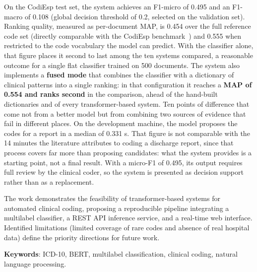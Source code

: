 On the CodiEsp test set, the system achieves an F1-micro of 0.495 and an F1-macro of 0.108 (global decision threshold of 0.2, selected on the validation set). Ranking quality, measured as per-document MAP, is 0.454 over the full reference code set (directly comparable with the CodiEsp benchmark~\cite{miranda2020}) and 0.555 when restricted to the code vocabulary the model can predict. With the classifier alone, that figure places it second to last among the ten systems compared, a reasonable outcome for a single flat classifier trained on 500 documents. The system also implements a \textbf{fused mode} that combines the classifier with a dictionary of clinical patterns into a single ranking: in that configuration it reaches a \textbf{MAP of 0.554 and ranks second} in the comparison, ahead of the hand-built dictionaries and of every transformer-based system. Ten points of difference that come not from a better model but from combining two sources of evidence that fail in different places. On the development machine, the model proposes the codes for a report in a median of 0.331 s. That figure is not comparable with the 14 minutes the literature attributes to coding a discharge report, since that process covers far more than proposing candidates: what the system provides is a starting point, not a final result. With a micro-F1 of 0.495, its output requires full review by the clinical coder, so the system is presented as decision support rather than as a replacement.

The work demonstrates the feasibility of transformer-based systems for automated clinical coding, proposing a reproducible pipeline integrating a multilabel classifier, a REST API inference service, and a real-time web interface. Identified limitations (limited coverage of rare codes and absence of real hospital data) define the priority directions for future work.

\bigskip

\noindent\textbf{Keywords}: ICD-10, BERT, multilabel classification, clinical coding, natural language processing.

\cleardoublepage %

